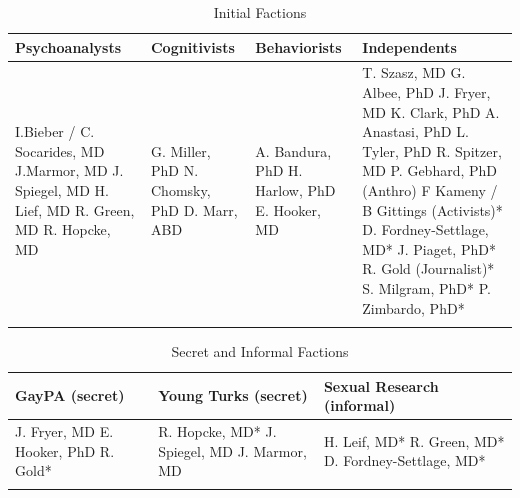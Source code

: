 \begin{refsection}
 \begin{longtable}[!t]{ | P{3cm} | P{3cm} | P{3cm} | P{3.5cm} | }
\hline
Psychoanalysts & Cognitivists & Behaviorists & Independents \\ \hline
I.Bieber / C. Socarides, MD \newline
J.Marmor, MD \newline
J. Spiegel, MD \newline
H. Lief, MD \newline
R. Green, MD \newline
R. Hopcke, MD &
G. Miller, PhD \newline
N. Chomsky, PhD \newline
D. Marr, ABD &
A. Bandura, PhD \newline
H. Harlow, PhD \newline
E. Hooker, MD \newline &
T. Szasz, MD\newline
G. Albee, PhD\newline
J. Fryer, MD\newline
K. Clark, PhD\newline
A. Anastasi, PhD\newline
L. Tyler, PhD\newline
R. Spitzer, MD\newline
P. Gebhard, PhD (Anthro)\newline
F Kameny / B Gittings (Activists)*\newline
D. Fordney-Settlage, MD*\newline
J. Piaget, PhD*\newline
R. Gold (Journalist)*\newline
S. Milgram, PhD*\newline
P. Zimbardo, PhD*\newline \\ \hline
\caption{Initial Factions}
\label{table: factions}
\end{longtable}


 \begin{longtable}[!t]{ | P{3cm} | P{3cm} | P{3.5cm} | }
\hline
GayPA (secret) & Young Turks (secret) & Sexual Research (informal)  \\ \hline
J. Fryer, MD\newline
E. Hooker, PhD\newline
R. Gold*
&
R. Hopcke, MD*\newline
J. Spiegel, MD\newline
J. Marmor, MD
&
H. Leif, MD*\newline
R. Green, MD*\newline
D. Fordney-Settlage, MD* \\ \hline
\caption{Secret and Informal Factions}
\label{table: secretfactions}
\end{longtable} 


\end{refsection}
